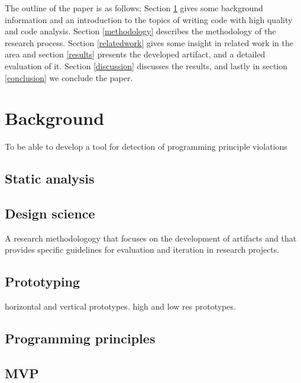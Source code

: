 \documentclass{article}
\begin{document}
The outline of the paper is as follows; Section \ref{background} gives some background information and an introduction to the topics of writing code with high quality and code analysis. Section \ref{methodology} describes the methodology of the research process. Section \ref{relatedwork} gives some insight in related work in the area and section \ref{results} presents the developed artifact, and a detailed evaluation of it. Section \ref{discussion} discusses the results, and lastly in section \ref{conclusion} we conclude the paper.  

\section{Background}
\label{background}
To be able to develop a tool for detection of programming principle violations 



\subsection{Static analysis}
\subsection{Design science}
A research methodologogy that focuses on the development of artifacts and that provides specific guidelines for evaluation and iteration in research projects.

\subsection{Prototyping}

horizontal and vertical prototypes. high and low res prototypes.

\subsection{Programming principles}

\subsection{MVP}
\end{document}
